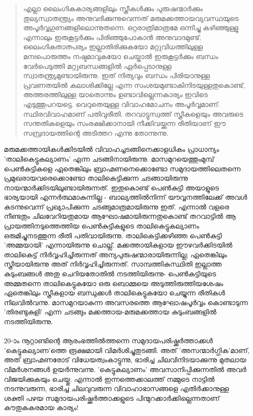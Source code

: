 \begin{quotation}
എല്ലാ ലൈംഗികകാര്യങ്ങളിലും സ്ത്രീകൾക്കും പുരുഷന്മാർക്കും തുല്യസ്വാതന്ത്ര്യം അനുവദിക്കുന്നുവെന്നത് മരുമക്കത്തായവ്യവസ്ഥയുടെ അപൂർവ്വഗുണങ്ങളിലൊന്നുതന്നെ. ഒറ്റരാത്രിമാത്രമേ ഒന്നിച്ചു കഴിഞ്ഞുള്ളു എന്നാലും ഇരുകൂട്ടർക്കും പിരിഞ്ഞുപോകാൻ അനുവാദമുണ്ട്. ലൈംഗികതാത്പര്യം ഇല്ലാതിരിക്കുകയോ മറ്റുവിധത്തിലുള്ള മനഃപൊരുത്തം നഷ്ടമാവുകയോ ചെയ്താൽ ഇരുകൂട്ടർക്കും ബന്ധം വേർപെടുത്തി മറ്റുബന്ധങ്ങളിൽ ഏർപ്പെടാനുള്ള സ്വാതന്ത്ര്യമുണ്ടായിരുന്നു. ഇത് നിത്യവും ബന്ധം പിരിയാനുള്ള പ്രവണതയിൽ കലാശിക്കില്ലേ എന്ന സംശയമുണ്ടാകിനിടയുള്ളതുകൊണ്ട്, അത്തരത്തിലുള്ള യാതൊന്നും ഉണ്ടാവില്ലെന്നകാര്യം ഇവിടെ എടുത്തുപറയട്ടെ. വെറുതെയുള്ള വിവാഹമോചനം അപൂർവ്വമാണ്. സ്ഥിരവിവാഹമാണ് പതിവുരീതി. തറവാട്ടുസ്വത്ത് സ്ത്രീകളെയും അവരുടെ സന്തതികളെയും സംരക്ഷിക്കാനായി നീക്കിവയ്ക്കുന്ന രീതിയാണ് ഈ സമ്പ്രദായത്തിന്റെ അടിത്തറ എന്നു തോന്നുന്നു.
\end{quotation}

\label{ch5box2} %
\begin{tcolorbox}[%
 breakable, %
  arc=0mm, 
  left=1pt, right = 1pt, 
  boxrule=0mm,
  colback = {blue!10}, %
] 

മരുമക്കത്തായികൾക്കിടയിൽ വിവാഹച്ചടങ്ങിനെക്കാളധികം പ്രാധാന്യം 'താലികെട്ടുകല്യാണം' എന്ന ചടങ്ങിനായിരുന്നു. മാസമുറയെത്തുംമുമ്പ് പെൺകുട്ടികളെ ഏതെങ്കിലും ബ്രാഹ്മണനെക്കൊണ്ടോ സമുദായത്തിലെതന്നെ പ്രമുഖരായവരെക്കൊണ്ടോ താലികെട്ടിക്കുന്ന ചടങ്ങായിരുന്നു നായന്മാർക്കിടയിലുണ്ടായിരുന്നത്. ഇതുകൊണ്ട് പെൺകുട്ടി അയാളുടെ ഭാര്യയായി എന്നർത്ഥമാകുന്നില്ല - ബാല്യത്തിൽനിന്ന് യൗവ്വനത്തിലേക്ക് അവൾ കടന്നുവെന്ന് പ്രഖ്യാപിക്കുന്ന ചടങ്ങുമാത്രമായിരുന്നു ഇത്. എന്നാൽ വളരെ നീണ്ടതും ചിലവേറിയതുമായ ആഘോഷമായിരുന്നതുകൊണ്ട് തറവാട്ടിൽ ആ പ്രായത്തിനടുത്തെത്തിയ പെൺകുട്ടികളുടെ താലികെട്ടുകല്യാണം ഒരുമിച്ചുനടത്തുന്ന രീതി പതിവായിരുന്നു. താലികെട്ടിക്കഴിഞ്ഞ പെൺകുട്ടി 'അമ്മയായി' എന്നായിരുന്നു ചൊല്ല്. മക്കത്തായികളായ ഈഴവർക്കിടയിൽ താലികെട്ട് നിർവ്വഹിച്ചിരുന്നത് അന്യപുരുഷന്മാരായിരുന്നില്ല; ഏതെങ്കിലും സ്ത്രീയായിരുന്നു അത് നിർവ്വഹിച്ചിരുന്നത്. സാമ്പത്തികസ്ഥിതി ഇല്ലാത്ത കുടുംബങ്ങൾ അതു ചെറിയതോതിൽ നടത്തിയിരുന്നു- പെൺകുട്ടിയുടെ അമ്മതന്നെ താലികെട്ടുകയോ ഒരു ബൊമ്മയെ അടുത്തിരുത്തിയശേഷം ഏതെങ്കിലും സ്ത്രീകളായ ബന്ധുക്കൾ താലികെട്ടുകയോ ചെയ്യുന്ന രീതികൾ നിലവിൽവന്നു. മാസമുറയാകുന്ന അവസരത്തെ ആഘോഷപൂർവ്വം കൊണ്ടാടുന്ന 'തിരണ്ടുകുളി' എന്ന ചടങ്ങും മക്കത്തായ-മരുമക്കത്തായ കുടുംബങ്ങളിൽ നടത്തിയിരുന്നു.
\paragraph{}

20-ാം നൂറ്റാണ്ടിന്റെ ആരംഭത്തിൽത്തന്നെ സമുദായപരിഷ്ക്കർത്താക്കൾ 'കെട്ടുകല്യാണ'ത്തെ രൂക്ഷമായി വിമർശിച്ചുതുടങ്ങി. അത് 'അസന്മാർഗ്ഗിക'മാണ്, അത് ബ്രാഹ്മണരോട് വിധേയത്വംകാട്ടുന്നു, ഭാരിച്ച ചിലവിനിടയാക്കുന്നു മുതലായ വിമർശനങ്ങൾ ഉയർന്നുവന്നു. 'കെട്ടുകല്യാണം' അവസാനിപ്പിക്കുന്നതിൽ അവർ വിജയിക്കുകയും ചെയ്തു. എന്നാൽ ഇന്നത്തെക്കാലത്ത് നമ്മുടെ നാട്ടിൽ നടന്നുവരുന്ന, ഭാരിച്ച ചിലവുവരുന്ന വിവാഹാഭാസങ്ങളെ എതിർക്കാനുള്ള ശക്തി പഴയ സമുദായപരിഷ്ക്കർത്താക്കളുടെ പിന്മുറക്കാർക്കില്ലെന്നതാണ് കൗതുകകരമായ കാര്യം!


\end{tcolorbox}

